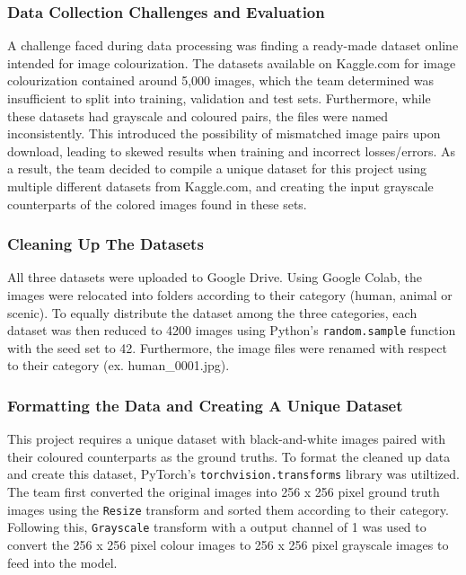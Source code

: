 \documentclass{article} %
\begin{document}
\subsubsection{Data Collection Challenges and Evaluation}

A challenge faced during data processing was finding a ready-made dataset online intended for image colourization. The datasets available on Kaggle.com for image colourization contained around 5,000 images, which the team determined was insufficient to split into training, validation and test sets. Furthermore, while these datasets had grayscale and coloured pairs, the files were named inconsistently. This introduced the possibility of mismatched image pairs upon download, leading to skewed results when training and incorrect losses/errors. As a result, the team decided to compile a unique dataset for this project using multiple different datasets from Kaggle.com, and creating the input grayscale counterparts of the colored images found in these sets. 

\subsubsection{Cleaning Up The Datasets}

All three datasets were uploaded to Google Drive. Using Google Colab, the images were relocated into folders according to their category (human, animal or scenic). To equally distribute the dataset among the three categories, each dataset was then reduced to 4200 images using Python’s \verb|random.sample| function with the seed set to 42. Furthermore, the image files were renamed with respect to their category (ex. human\_0001.jpg). 

\subsubsection{Formatting the Data and Creating A Unique Dataset}

This project requires a unique dataset with black-and-white images paired with their coloured counterparts as the ground truths. To format the cleaned up data and create this dataset, PyTorch’s \verb|torchvision.transforms| library was utiltized. The team first converted the original images into 256 x 256 pixel ground truth images using the \verb|Resize| transform and sorted them according to their category. Following this, \verb|Grayscale| transform with a output channel of 1 was used to convert the 256 x 256 pixel colour images to 256 x 256 pixel grayscale images to feed into the model. 
\end{document}
